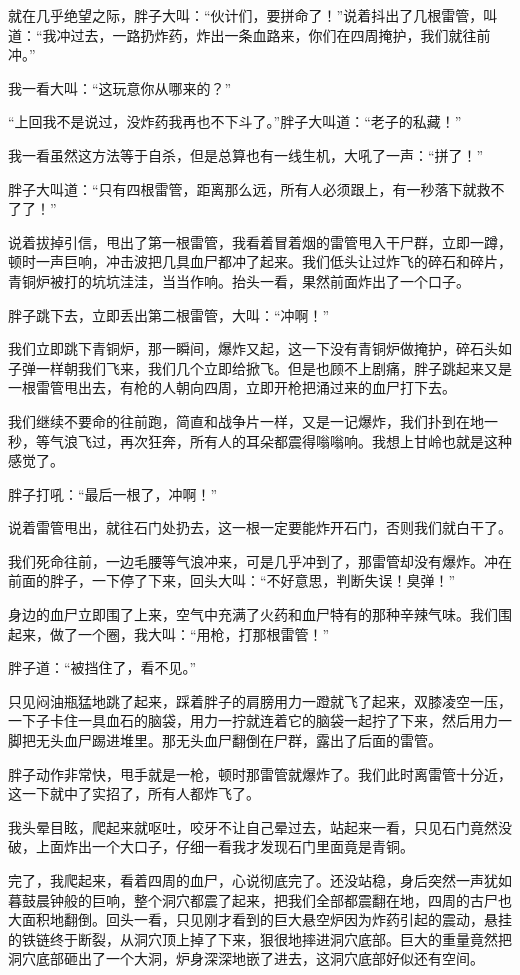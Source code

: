 就在几乎绝望之际，胖子大叫：“伙计们，要拼命了！”说着抖出了几根雷管，叫道：“我冲过去，一路扔炸药，炸出一条血路来，你们在四周掩护，我们就往前冲。”

我一看大叫：“这玩意你从哪来的？”

“上回我不是说过，没炸药我再也不下斗了。”胖子大叫道：“老子的私藏！”

我一看虽然这方法等于自杀，但是总算也有一线生机，大吼了一声：“拼了！”

胖子大叫道：“只有四根雷管，距离那么远，所有人必须跟上，有一秒落下就救不了了！”

说着拔掉引信，甩出了第一根雷管，我看着冒着烟的雷管甩入干尸群，立即一蹲，顿时一声巨响，冲击波把几具血尸都冲了起来。我们低头让过炸飞的碎石和碎片，青铜炉被打的坑坑洼洼，当当作响。抬头一看，果然前面炸出了一个口子。

胖子跳下去，立即丢出第二根雷管，大叫：“冲啊！”

我们立即跳下青铜炉，那一瞬间，爆炸又起，这一下没有青铜炉做掩护，碎石头如子弹一样朝我们飞来，我们几个立即给掀飞。但是也顾不上剧痛，胖子跳起来又是一根雷管甩出去，有枪的人朝向四周，立即开枪把涌过来的血尸打下去。

我们继续不要命的往前跑，简直和战争片一样，又是一记爆炸，我们扑到在地一秒，等气浪飞过，再次狂奔，所有人的耳朵都震得嗡嗡响。我想上甘岭也就是这种感觉了。

胖子打吼：“最后一根了，冲啊！”

说着雷管甩出，就往石门处扔去，这一根一定要能炸开石门，否则我们就白干了。

我们死命往前，一边毛腰等气浪冲来，可是几乎冲到了，那雷管却没有爆炸。冲在前面的胖子，一下停了下来，回头大叫：“不好意思，判断失误！臭弹！”

身边的血尸立即围了上来，空气中充满了火药和血尸特有的那种辛辣气味。我们围起来，做了一个圈，我大叫：“用枪，打那根雷管！”

胖子道：“被挡住了，看不见。”

只见闷油瓶猛地跳了起来，踩着胖子的肩膀用力一蹬就飞了起来，双膝凌空一压，一下子卡住一具血石的脑袋，用力一拧就连着它的脑袋一起拧了下来，然后用力一脚把无头血尸踢进堆里。那无头血尸翻倒在尸群，露出了后面的雷管。

胖子动作非常快，甩手就是一枪，顿时那雷管就爆炸了。我们此时离雷管十分近，这一下就中了实招了，所有人都炸飞了。

我头晕目眩，爬起来就呕吐，咬牙不让自己晕过去，站起来一看，只见石门竟然没破，上面炸出一个大口子，仔细一看我才发现石门里面竟是青铜。

完了，我爬起来，看着四周的血尸，心说彻底完了。还没站稳，身后突然一声犹如暮鼓晨钟般的巨响，整个洞穴都震了起来，把我们全部都震翻在地，四周的古尸也大面积地翻倒。回头一看，只见刚才看到的巨大悬空炉因为炸药引起的震动，悬挂的铁链终于断裂，从洞穴顶上掉了下来，狠很地摔进洞穴底部。巨大的重量竟然把洞穴底部砸出了一个大洞，炉身深深地嵌了进去，这洞穴底部好似还有空间。

